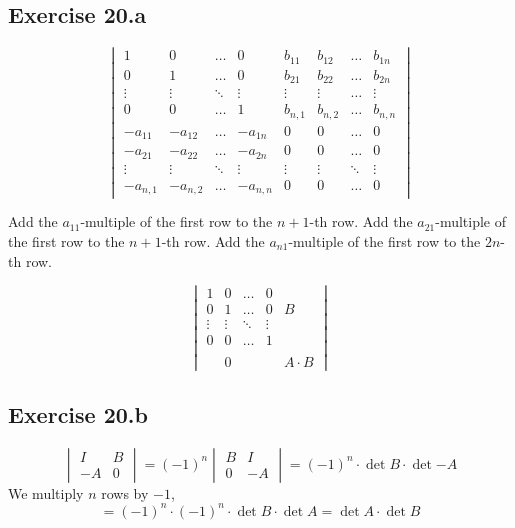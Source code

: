 \documentclass[a4paper]{article}
\theoremstyle{definition}
\begin{document}
\subsection{Exercise 20.a}

\[
  \begin{vmatrix}
    1 & 0 & \ldots & 0 & b_{11} & b_{12} & \ldots & b_{1n} \\
    0 & 1 & \ldots & 0 & b_{21} & b_{22} & \ldots & b_{2n} \\
    \vdots & \vdots & \ddots & \vdots & \vdots & \vdots & \ldots & \vdots \\
    0 & 0 & \ldots & 1 & b_{n,1} & b_{n,2} & \ldots & b_{n,n} \\
    -a_{11} & -a_{12} & \ldots & -a_{1n} & 0 & 0 & \ldots & 0 \\
    -a_{21} & -a_{22} & \ldots & -a_{2n} & 0 & 0 & \ldots & 0 \\
    \vdots & \vdots & \ddots & \vdots & \vdots & \vdots & \ddots & \vdots \\
    -a_{n,1} & -a_{n,2} & \ldots & -a_{n,n} & 0 & 0 & \ldots & 0
  \end{vmatrix}
\]

Add the $a_{11}$-multiple of the first row to the $n+1$-th row.
Add the $a_{21}$-multiple of the first row to the $n+1$-th row.
Add the $a_{n1}$-multiple of the first row to the $2n$-th row.

\[
  \begin{vmatrix}
    1 & 0 & \ldots & 0 &      \\
    0 & 1 & \ldots & 0 &    B \\
    \vdots & \vdots & \ddots & \vdots & \\
    0 & 0 & \ldots & 1 & \\
      &   &        &   & \\
      & 0 &        &   & A \cdot B
  \end{vmatrix}
\]

\subsection{Exercise 20.b}

\[
  \begin{vmatrix}
    I & B \\
    -A & 0
  \end{vmatrix}
  = (-1)^n \begin{vmatrix} B & I \\ 0 & -A \end{vmatrix}
  = (-1)^n \cdot \det{B} \cdot \det{-A}
\]
We multiply $n$ rows by $-1$,
\[
  = (-1)^n \cdot (-1)^n \cdot \det{B} \cdot \det{A}
  = \det{A} \cdot \det{B}
\]
\end{document}
